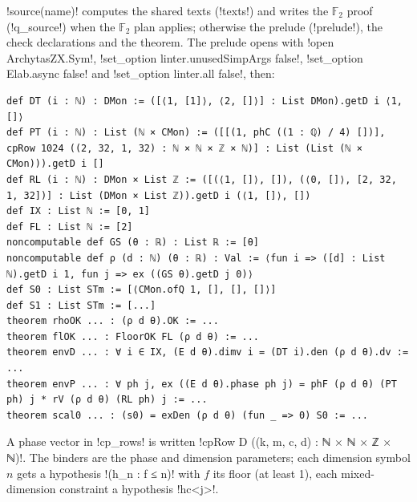 {{{\lexpy!source(name)! computes the shared texts (\lexpy!texts!) and writes the $\mathbb{F}_2$ proof
(\lexpy!q_source!) when the $\mathbb{F}_2$ plan applies; otherwise the prelude (\lexpy!prelude!),
the check declarations and the theorem. The prelude opens with
\lexlean!open ArchytasZX.Sym!, \lexcode!set_option linter.unusedSimpArgs false!,
\lexcode!set_option Elab.async false! and \lexcode!set_option linter.all false!, then:
\begin{lstlisting}[style=lexlean]
def DT (i : ℕ) : DMon := ([⟨1, [1]⟩, ⟨2, []⟩] : List DMon).getD i ⟨1, []⟩
def PT (i : ℕ) : List (ℕ × CMon) := ([[(1, phC ((1 : ℚ) / 4) [])], cpRow 1024 ((2, 32, 1, 32) : ℕ × ℕ × ℤ × ℕ)] : List (List (ℕ × CMon))).getD i []
def RL (i : ℕ) : DMon × List ℤ := ([(⟨1, []⟩, []), (⟨0, []⟩, [2, 32, 1, 32])] : List (DMon × List ℤ)).getD i (⟨1, []⟩, [])
def IX : List ℕ := [0, 1]
def FL : List ℕ := [2]
noncomputable def GS (θ : ℝ) : List ℝ := [θ]
noncomputable def ρ (d : ℕ) (θ : ℝ) : Val := ⟨fun i => ([d] : List ℕ).getD i 1, fun j => ex ((GS θ).getD j 0)⟩
def S0 : List STm := [⟨CMon.ofQ 1, [], [], []⟩]
def S1 : List STm := [...]
theorem rhoOK ... : (ρ d θ).OK := ...
theorem flOK ... : FloorOK FL (ρ d θ) := ...
theorem envD ... : ∀ i ∈ IX, (E d θ).dimv i = (DT i).den (ρ d θ).dv := ...
theorem envP ... : ∀ ph j, ex ((E d θ).phase ph j) = phF (ρ d θ) (PT ph) j * rV (ρ d θ) (RL ph) j := ...
theorem scal0 ... : (s0) = exDen (ρ d θ) (fun _ => 0) S0 := ...
\end{lstlisting}
A phase vector in \lexpy!cp_rows! is written \lexlean!cpRow D ((k, m, c, d) : ℕ × ℕ × ℤ × ℕ)!. The
binders are the phase and dimension parameters; each dimension symbol $n$ gets a hypothesis
\lexlean!(h_n : f ≤ n)! with $f$ its floor (at least 1), each mixed-dimension constraint a
hypothesis \lexlean!hc<j>!.

}}}
